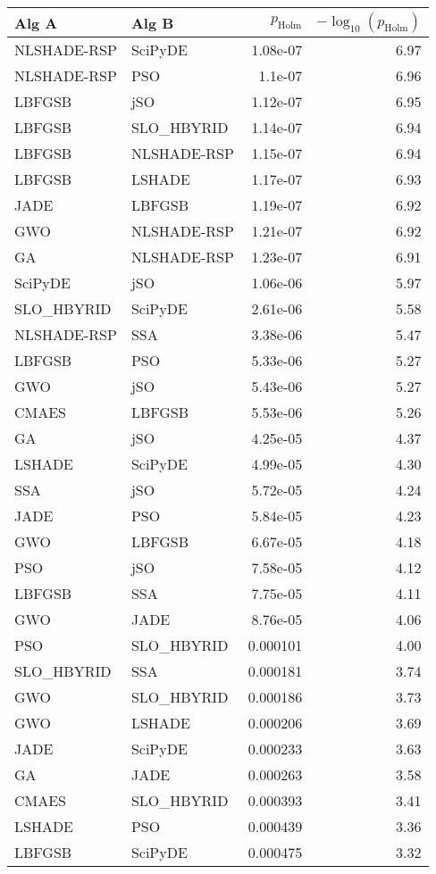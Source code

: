 \begin{table}[t]\centering\small
\begin{tabular}{l l r r}\toprule
Alg A & Alg B & $p_{\text{Holm}}$ & $-\log_{10}(p_{\text{Holm}})$\\\midrule
NLSHADE-RSP & SciPyDE & 1.08e-07 & 6.97\\
NLSHADE-RSP & PSO & 1.1e-07 & 6.96\\
LBFGSB & jSO & 1.12e-07 & 6.95\\
LBFGSB & SLO_HBYRID & 1.14e-07 & 6.94\\
LBFGSB & NLSHADE-RSP & 1.15e-07 & 6.94\\
LBFGSB & LSHADE & 1.17e-07 & 6.93\\
JADE & LBFGSB & 1.19e-07 & 6.92\\
GWO & NLSHADE-RSP & 1.21e-07 & 6.92\\
GA & NLSHADE-RSP & 1.23e-07 & 6.91\\
SciPyDE & jSO & 1.06e-06 & 5.97\\
SLO_HBYRID & SciPyDE & 2.61e-06 & 5.58\\
NLSHADE-RSP & SSA & 3.38e-06 & 5.47\\
LBFGSB & PSO & 5.33e-06 & 5.27\\
GWO & jSO & 5.43e-06 & 5.27\\
CMAES & LBFGSB & 5.53e-06 & 5.26\\
GA & jSO & 4.25e-05 & 4.37\\
LSHADE & SciPyDE & 4.99e-05 & 4.30\\
SSA & jSO & 5.72e-05 & 4.24\\
JADE & PSO & 5.84e-05 & 4.23\\
GWO & LBFGSB & 6.67e-05 & 4.18\\
PSO & jSO & 7.58e-05 & 4.12\\
LBFGSB & SSA & 7.75e-05 & 4.11\\
GWO & JADE & 8.76e-05 & 4.06\\
PSO & SLO_HBYRID & 0.000101 & 4.00\\
SLO_HBYRID & SSA & 0.000181 & 3.74\\
GWO & SLO_HBYRID & 0.000186 & 3.73\\
GWO & LSHADE & 0.000206 & 3.69\\
JADE & SciPyDE & 0.000233 & 3.63\\
GA & JADE & 0.000263 & 3.58\\
CMAES & SLO_HBYRID & 0.000393 & 3.41\\
LSHADE & PSO & 0.000439 & 3.36\\
LBFGSB & SciPyDE & 0.000475 & 3.32\\

\end{tabular}
\end{table}
